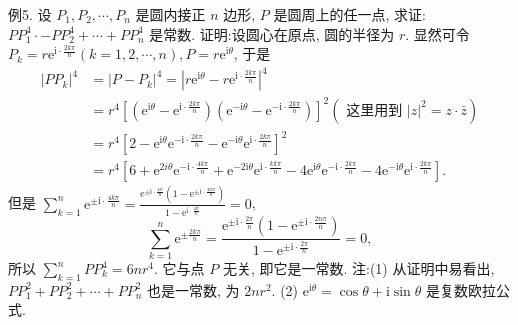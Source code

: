 例5. 设 $P_1, P_2, \cdots, P_n$ 是圆内接正 $n$ 边形, $P$ 是圆周上的任一点, 求证: $P P_1^4 \cdot-P P_2^4+\cdots+P P_n^4$ 是常数.
证明:设圆心在原点, 圆的半径为 $r$.
显然可令 $P_k=r \mathrm{e}^{\mathrm{i} \cdot \frac{2 k \pi}{n}}(k=1,2, \cdots, n), P=r \mathrm{e}^{\mathrm{i} \theta}$, 于是
$$
\begin{aligned}
\left|P P_k\right|^4 & =\left|P-P_k\right|^4=\left|r \mathrm{e}^{\mathrm{i} \theta}-r \mathrm{e}^{\mathrm{i} \cdot \frac{2 k \pi}{n}}\right|^4 \\
& =r^4\left[\left(\mathrm{e}^{\mathrm{i} \theta}-\mathrm{e}^{\mathrm{i} \cdot \frac{2 k \pi}{n}}\right)\left(\mathrm{e}^{-\mathrm{i} \theta}-\mathrm{e}^{-\mathrm{i} \cdot \frac{2 k \pi}{n}}\right)\right]^2\left(\text { 这里用到 }|z|^2=z \cdot \bar{z}\right) \\
& =r^4\left[2-\mathrm{e}^{\mathrm{i} \theta} \mathrm{e}^{-\mathrm{i} \cdot \frac{2 k \pi}{n}}-\mathrm{e}^{-\mathrm{i} \theta} \mathrm{e}^{\mathrm{i} \cdot \frac{2 k \pi}{n}}\right]^2 \\
& =r^4\left[6+\mathrm{e}^{2 i \theta} \mathrm{e}^{-\mathrm{i} \cdot \frac{4 k \pi}{n}}+\mathrm{e}^{-2 \mathrm{i} \theta} \mathrm{e}^{\mathrm{i} \cdot \frac{k k \pi}{n}}-4 \mathrm{e}^{\mathrm{i} \theta} \mathrm{e}^{-\mathrm{i} \cdot \frac{2 k \pi}{n}}-4 \mathrm{e}^{-\mathrm{i} \theta} \mathrm{e}^{\mathrm{i} \cdot \frac{2 k \pi}{n}}\right] .
\end{aligned}
$$
但是 $\sum_{k=1}^n \mathrm{e}^{ \pm \mathrm{i} \cdot \frac{4 k \pi}{n}}=\frac{\mathrm{e}^{ \pm \mathrm{i} \cdot \frac{4 \pi}{n}}\left(1-\mathrm{e}^{ \pm \mathrm{i} \cdot \frac{4 n \pi}{n}}\right)}{1-\mathrm{e}^{\mathrm{i} \cdot \frac{4 \pi}{n}}}=0$,
$$
\sum_{k=1}^n \mathrm{e}^{ \pm \frac{2 k \pi}{n}}=\frac{\mathrm{e}^{ \pm \mathrm{i} \cdot \frac{2 \pi}{n}}\left(1-\mathrm{e}^{ \pm \mathrm{i} \cdot \frac{2 n \pi}{n}}\right)}{1-\mathrm{e}^{ \pm \mathrm{i} \cdot \frac{2 \pi}{n}}}=0,
$$
所以 $\sum_{k=1}^n P P_k^4=6 n r^4$.
它与点 $P$ 无关, 即它是一常数.
注:(1) 从证明中易看出, $P P_1^2+P P_2^2+\cdots+P P_n^2$ 也是一常数, 为 $2 n r^2$.
(2) $\mathrm{e}^{\mathrm{i} \theta}=\cos \theta+\mathrm{i} \sin \theta$ 是复数欧拉公式.



